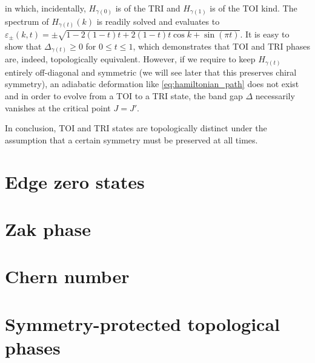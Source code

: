 in which, incidentally, $H_{\gamma(0)}$ is of the TRI and $H_{\gamma(1)}$ is of the TOI kind.
The spectrum of $H_{\gamma(t)}(k)$ is readily solved and evaluates to $\varepsilon_\pm(k,t)=\pm\sqrt{1-2(1-t)t+2(1-t)t\cos k+\sin(\pi t)}$.
It is easy to show that $\Delta_{\gamma(t)}\geq0$ for $0\leq t\leq1$, which demonstrates that TOI and TRI phases are, indeed, topologically equivalent.
However, if we require to keep $H_{\gamma(t)}$ entirely off-diagonal and symmetric (we will see later that this preserves chiral symmetry), an adiabatic deformation like \cref{eq:hamiltonian_path} does not exist and in order to evolve from a TOI to a TRI state, the band gap $\Delta$ necessarily vanishes at the critical point $J=J'$.

In conclusion, TOI and TRI states are topologically distinct under the assumption that a certain symmetry must be preserved at all times.
%
%
\section{Edge zero states}
\label{sec:edge_zero_states}
%
%
%
%
\section{Zak phase}
\label{sec:zak_phase}
%
%
%
%
\section{Chern number}
\label{sec:chern_number}
%
%
%
%
\section{Symmetry-protected topological phases}
\label{sec:symmetry_protected_topological_phases}
%
%
